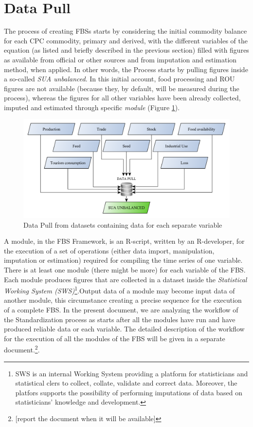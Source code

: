 \documentclass[]{article}
\let\rmarkdownfootnote\footnote%
\def\footnote{\protect\rmarkdownfootnote}
\begin{document}
\section{Data Pull}\label{data-pull}

The process of creating FBSs starts by considering the initial commodity
balance for each CPC commodity, primary and derived, with the different
variables of the equation (as listed and briefly described in the
previous section) filled with figures as available from official or
other sources and from imputation and estimation method, when applied.
In other words, the Process starts by pulling figures inside a so-called
\emph{SUA unbalanced}. In this initial account, food processing and ROU
figures are not available (because they, by default, will be measured
during the process), whereas the figures for all other variables have
been already collected, imputed and estimated through specific
\emph{module} (Figure \ref{fig:f1}).

\begin{figure}[htbp]
\centering
\includegraphics{images/01_pulldata.pdf}
\caption{\label{fig:f1}Data Pull from datasets containing data for each
separate variable}
\end{figure}

A module, in the FBS Framework, is an R-script, written by an
R-developer, for the execution of a set of operations (either data
import, manipulation, imputation or estimation) required for compiling
the time series of one variable. There is at least one module (there
might be more) for each variable of the FBS. Each module produces
figures that are collected in a dataset inside the \emph{Statistical
Working System (SWS)}\footnote{SWS is an internal Working System
  providing a platform for statisticians and statistical clers to
  collect, collate, validate and correct data. Moreover, the platfors
  supports the possibility of performing imputations of data based on
  statisticians' knowledge and development.}.Output data of a module may
become input data of another module, this circumstance creating a
precise sequence for the execution of a complete FBS. In the present
document, we are analyzing the workflow of the Standardization process
as starts after all the modules have run and have produced reliable data
or each variable. The detailed description of the workflow for the
execution of all the modules of the FBS will be given in a separate
document.\footnote{{[}report the document when it will be available{]}}.
\end{document}
